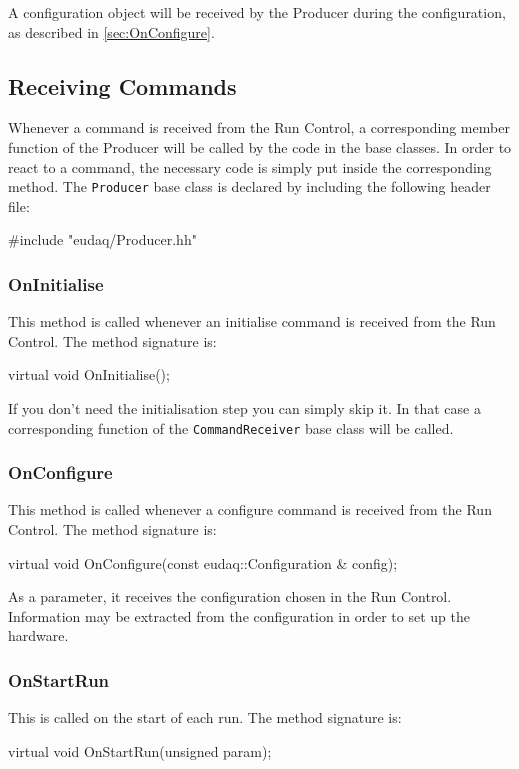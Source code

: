 A configuration object will be received by the Producer during the configuration,
as described in \autoref{sec:OnConfigure}.

\subsection{Receiving Commands}
Whenever a command is received from the Run Control,
a corresponding member function of the Producer will be called by the code in the base classes.
In order to react to a command, the necessary code is simply put inside the corresponding method.
The \texttt{Producer} base class is declared by including the following header file:
\begin{listing}
#include "eudaq/Producer.hh"
\end{listing}

\subsubsection{OnInitialise}
This method is called whenever an initialise command is received from the Run Control.
The method signature is:
\begin{listing}
virtual void OnInitialise();
\end{listing}

If you don't need the initialisation step you can simply skip it. In that case a corresponding function of the \texttt{CommandReceiver} base class will be called.

\subsubsection{OnConfigure}\label{sec:OnConfigure}
This method is called whenever a configure command is received from the Run Control.
The method signature is:
\begin{listing}
virtual void OnConfigure(const eudaq::Configuration & config);
\end{listing}

As a parameter, it receives the configuration chosen in the Run Control.
Information may be extracted from the configuration in order to set up the hardware.

\subsubsection{OnStartRun}
This is called on the start of each run.
The method signature is:
\begin{listing}
virtual void OnStartRun(unsigned param);
\end{listing}

